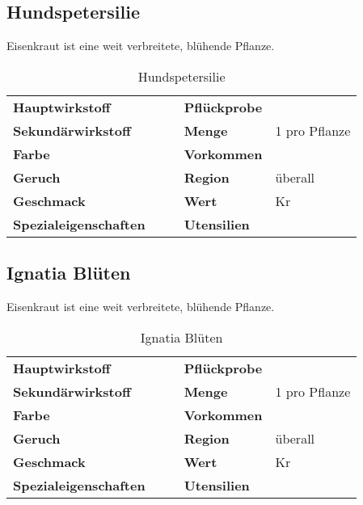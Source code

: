 \subsection{Hundspetersilie}
Eisenkraut ist eine weit verbreitete, blühende Pflanze. 

\begin{table}[h]
\begin{center}
\begin{tabular}{|l|l|p{1cm}|l|l|}
	\cline{1-2} \cline{4-5}
	\textbf{Hauptwirkstoff} &  && \textbf{Pflückprobe} &  \\ \cline{1-2} \cline{4-5}
	\textbf{Sekundärwirkstoff} &  && \textbf{Menge} & 1 pro Pflanze \\ \cline{1-2} \cline{4-5}
	\textbf{Farbe} &  && \textbf{Vorkommen} &  \\ \cline{1-2} \cline{4-5}
	\textbf{Geruch} &  && \textbf{Region} & überall \\ \cline{1-2} \cline{4-5}
	\textbf{Geschmack} &  && \textbf{Wert} & Kr \\ \cline{1-2} \cline{4-5}
	\textbf{Spezialeigenschaften} &  && \textbf{Utensilien} &  \\ \cline{1-2} \cline{4-5}
\end{tabular}
\end{center}
\caption{Hundspetersilie}
\label{tab:hundspetersilie}
\end{table}


\subsection{Ignatia Blüten}
Eisenkraut ist eine weit verbreitete, blühende Pflanze. 

\begin{table}[h]
\begin{center}
\begin{tabular}{|l|l|p{1cm}|l|l|}
	\cline{1-2} \cline{4-5}
	\textbf{Hauptwirkstoff} &  && \textbf{Pflückprobe} &  \\ \cline{1-2} \cline{4-5}
	\textbf{Sekundärwirkstoff} &  && \textbf{Menge} & 1 pro Pflanze \\ \cline{1-2} \cline{4-5}
	\textbf{Farbe} &  && \textbf{Vorkommen} &  \\ \cline{1-2} \cline{4-5}
	\textbf{Geruch} &  && \textbf{Region} & überall \\ \cline{1-2} \cline{4-5}
	\textbf{Geschmack} &  && \textbf{Wert} & Kr \\ \cline{1-2} \cline{4-5}
	\textbf{Spezialeigenschaften} &  && \textbf{Utensilien} &  \\ \cline{1-2} \cline{4-5}
\end{tabular}
\end{center}
\caption{Ignatia Blüten}
\label{tab:ignatia_blueten}
\end{table}


